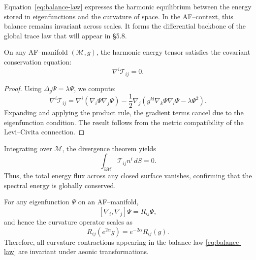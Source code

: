 \begin{remark}
Equation~\eqref{eq:balance-law} expresses the harmonic equilibrium
between the energy stored in eigenfunctions and the curvature of space.
In the AF–context, this balance remains invariant across scales.
It forms the differential backbone of the global trace law
that will appear in \S5.8.
\end{remark}


\begin{theorem}
\label{thm:tensor-conservation}
On any AF–manifold \((\mathcal{M},g)\),
the harmonic energy tensor satisfies the covariant conservation equation:
\begin{equation}
\nabla^i \mathcal{T}_{ij} = 0.
\end{equation}
\end{theorem}

\begin{proof}
Using \(\Delta_g\Psi = \lambda \Psi\),
we compute:
\[
\nabla^i \mathcal{T}_{ij}
=
\nabla^i(\nabla_i \Psi \nabla_j \Psi)
- \frac{1}{2}\nabla_j\!\left(
g^{kl}\nabla_k \Psi \nabla_l \Psi
- \lambda \Psi^2
\right).
\]
Expanding and applying the product rule,
the gradient terms cancel due to the eigenfunction condition.
The result follows from the metric compatibility
of the Levi–Civita connection.
\end{proof}

\begin{corollary}
Integrating over \(\mathcal{M}\),
the divergence theorem yields
\begin{equation}
\int_{\partial\mathcal{M}} \mathcal{T}_{ij}n^i\,dS = 0.
\end{equation}
Thus, the total energy flux across any closed surface vanishes,
confirming that the spectral energy is globally conserved.
\end{corollary}


\begin{lemma}
\label{lem:AF-ricci}
For any eigenfunction \(\Psi\) on an AF–manifold,
\[
[\nabla_i,\nabla_j]\Psi = R_{ij}\Psi,
\]
and hence the curvature operator scales as
\[
R_{ij}(e^{2\alpha}g) = e^{-2\alpha} R_{ij}(g).
\]
Therefore, all curvature contractions
appearing in the balance law \eqref{eq:balance-law}
are invariant under aeonic transformations.
\end{lemma}

